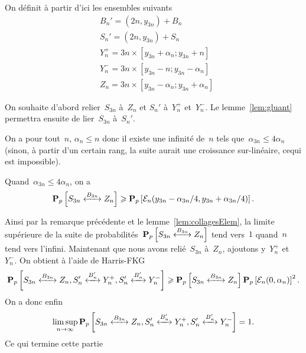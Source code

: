 		On définit à partir d'ici les ensembles suivants
		\begin{align*}
			&B_n' = (2n, y_{3n}) + B_n \\
			&S_n' = (2n, y_{3n}) + S_n \\
			&Y_n^+ = {3n} \times [y_{3n} + \alpha_n; y_{3n} + n] \\
			&Y_n^- = {3n} \times [y_{3n} - n; y_{3n} - \alpha_n] \\
			&Z_n = {3n} \times [y_{3n} - \alpha_n; y_{3n} + \alpha_n]
		\end{align*}
		

		On souhaite d'abord relier~$S_{3n}$ à~$Z_n$ et $S_n'$ à~$Y_n^+$ et~$Y_n^-$. Le lemme~\ref{lem:gluant} permettra ensuite de lier~$S_{3n}$ à~$S_n'$.

		On a pour tout~$n$, $\alpha_n \leq n$ donc il existe une infinité de~$n$ tels que~$\alpha_{3n} \leq 4\alpha_n$ (sinon, à partir d'un certain rang, la suite aurait une croissance sur-linéaire, cequi est impossible). 
		
		Quand~$\alpha_{3n} \leq 4\alpha_n$, on a
		\[
			\Pp{\relie[B_{3n}]{S_{3n}}{Z_n}} \geq \Pp{\mathcal{E}_n(y_{3n} - \alpha_{3n}/4, y_{3n} + \alpha_{3n}/4)}.
		\]

		Ainsi par la remarque précédente et le lemme~\ref{lem:collagesElem}, la limite supérieure de la suite de probabilités~$\Pp{\relie[B_{3n}]{S_{3n}}{Z_n}}$ tend vers~$1$ quand~$n$ tend vers l'infini. Maintenant que nous avons relié~$S_{3n}$ à~$Z_n$, ajoutons y~$Y_n^+$ et~$Y_n^-$. On obtient à l'aide de Harris-FKG
		\[
			\Pp{\relie[B_{3n}]{S_{3n}}{Z_n}, \relie[B_n']{S_n'}{Y_n^+}, \relie[B_n']{S_n'}{Y_n^-}} \geq \Pp{\relie[B_{3n}]{S_{3n}}{Z_n} }\Pp{\mathcal{E}_n(0, \alpha_n)}^2.
		\]
		On a donc enfin
		\[ 
			\limsup_{n \to \infty} \Pp{\relie[B_{3n}]{S_{3n}}{Z_n}, \relie[B_n']{S_n'}{Y_n^+}, \relie[B_n']{S_n'}{Y_n^-}} = 1.
		\]
		Ce qui termine cette partie
